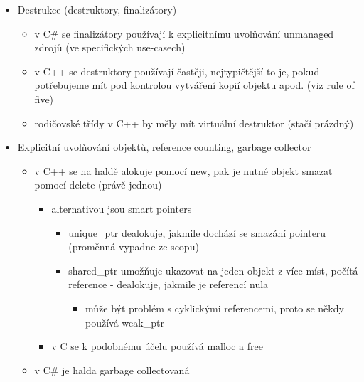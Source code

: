 \begin{itemize}
\begin{itemize}
\begin{itemize}
\item \texttt{public \allowbreak{}B(\allowbreak{}params1)\allowbreak{} \allowbreak{}: \allowbreak{}base(\allowbreak{}params2)\allowbreak{} \allowbreak{}\{}
\item není to optional, rodičovský konstruktor se volá pokaždé (defaultně bez parametrů)
\end{itemize}
\item konstruktor předka se vždy volá před konstruktorem potomka
\item v C++ je syntaxe velmi podobná, akorát místo \texttt{base} píšeme přímo název rodičovské třídy
\end{itemize}
\item Destrukce (destruktory, finalizátory)
\begin{itemize}
\item v C\# se finalizátory používají k explicitnímu uvolňování unmanaged zdrojů (ve specifických use-casech)
\item v C++ se destruktory používají častěji, nejtypičtější to je, pokud potřebujeme mít pod kontrolou vytváření kopií objektu apod. (viz rule of five)
\item rodičovské třídy v C++ by měly mít virtuální destruktor (stačí prázdný)
\end{itemize}
\item Explicitní uvolňování objektů, reference counting, garbage collector
\begin{itemize}
\item v C++ se na haldě alokuje pomocí new, pak je nutné objekt smazat pomocí delete (právě jednou)
\begin{itemize}
\item alternativou jsou smart pointers
\begin{itemize}
\item unique\_ptr dealokuje, jakmile dochází se smazání pointeru (proměnná vypadne ze scopu)
\item shared\_ptr umožňuje ukazovat na jeden objekt z více míst, počítá reference - dealokuje, jakmile je referencí nula
\begin{itemize}
\item může být problém s cyklickými referencemi, proto se někdy používá weak\_ptr
\end{itemize}
\end{itemize}
\item v C se k podobnému účelu používá malloc a free
\end{itemize}
\item v C\# je halda garbage collectovaná

\end{itemize}
\end{itemize}
